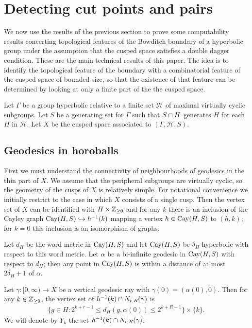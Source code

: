 \section{Detecting cut points and pairs}\label{sec:cutpairsalgorithms}

We now use the results of the previous section to prove some computability
results concerting topological features of the Bowditch boundary of a hyperbolic group
under the assumption that the cusped space satisfies a double dagger condition. These
are the main technical results of this paper. The idea is to identify the
topological feature of the boundary with a combinatorial feature of the cusped
space of bounded size, so that the existence of that feature can be
determined by looking at only a finite part of the the cusped space.

Let $\Gamma$ be a group hyperbolic relative to a finite set $\mathcal{H}$ of
maximal virtually cyclic subgroups. Let $S$ be a generating set for $\Gamma$ such that
$S \cap H$ generates $H$ for each $H$ in $\mathcal{H}$. Let $X$ be the
cusped space associated to $(\Gamma, \mathcal{H}, S)$.

\subsection{Geodesics in horoballs}\label{sec:horoballs}

First we must understand the connectivity of neighbourhoods of geodesics in the
thin part of $X$.  We assume that the peripheral subgroups are virtually cyclic, so
the geometry of the cusps of $X$ is relatively simple. For notational
convenience we initially restrict to the case in which $X$ consists of a single
cusp. Then the vertex set of $X$ can be identified with $H \times
\mathbb{Z}_{\geq 0}$ and for any $k$ there is an inclusion of the Cayley graph $\operatorname{\mathrm{Cay}}(H, S)
\hookrightarrow h^{-1}(k)$ mapping a vertex $h \in \operatorname{\mathrm{Cay}}(H, S)$ to $(h, k)$; for
$k = 0$ this inclusion is an isomorphism of graphs. 

Let $d_H$ be the word metric in $\operatorname{\mathrm{Cay}}(H, S)$ and let $\operatorname{\mathrm{Cay}}(H, S)$ be
$\delta_H$-hyperbolic with respect to this word metric. Let $\alpha$ be a
bi-infinite geodesic in $\operatorname{\mathrm{Cay}}(H, S)$ with respect to $d_H$; then any point in
$\operatorname{\mathrm{Cay}}(H, S)$ is within a distance of at most $2\delta_H + 1$ of $\alpha$.

Let $\gamma \colon [0, \infty) \to X$ be a vertical geodesic ray with
$\gamma(0) = (\alpha(0), 0)$. Then for any $k \in \mathbb{Z}_{\geq 0}$, the
vertex set of $h^{-1}(k) \cap N_{r, R}(\gamma)$ is
\begin{align*}
  \{g \in H \colon 2^{k + r - 1} \leq d_H(g, \alpha(0)) \leq 2^{k + R - 1}\} \times \{k\}.
\end{align*} 
We will denote by $Y_k$ the set $h^{-1}(k) \cap N_{r, R}(\gamma)$.

